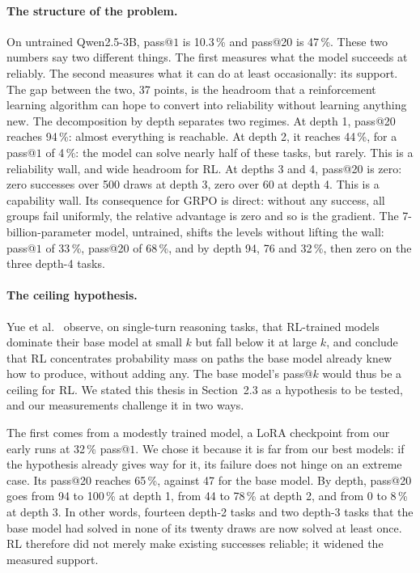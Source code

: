 \documentclass[11pt,a4paper]{article}
\begin{document}
\paragraph{The structure of the problem.} On untrained Qwen2.5-3B, pass@$1$ is 10.3\,\% and pass@20 is 47\,\%. These two numbers say two different things. The first measures what the model succeeds at reliably. The second measures what it can do at least occasionally: its support. The gap between the two, 37 points, is the headroom that a reinforcement learning algorithm can hope to convert into reliability without learning anything new. The decomposition by depth separates two regimes. At depth 1, pass@20 reaches 94\,\%: almost everything is reachable. At depth 2, it reaches 44\,\%, for a pass@$1$ of 4\,\%: the model can solve nearly half of these tasks, but rarely. This is a reliability wall, and wide headroom for RL. At depths 3 and 4, pass@20 is zero: zero successes over 500 draws at depth 3, zero over 60 at depth 4. This is a capability wall. Its consequence for GRPO is direct: without any success, all groups fail uniformly, the relative advantage is zero and so is the gradient. The 7-billion-parameter model, untrained, shifts the levels without lifting the wall: pass@$1$ of 33\,\%, pass@20 of 68\,\%, and by depth 94, 76 and 32\,\%, then zero on the three depth-4 tasks.

\paragraph{The ceiling hypothesis.} Yue et al.~\cite{yue2025rlvr} observe, on single-turn reasoning tasks, that RL-trained models dominate their base model at small $k$ but fall below it at large $k$, and conclude that RL concentrates probability mass on paths the base model already knew how to produce, without adding any. The base model's pass@$k$ would thus be a ceiling for RL. We stated this thesis in Section~2.3 as a hypothesis to be tested, and our measurements challenge it in two ways.

The first comes from a modestly trained model, a LoRA checkpoint from our early runs at 32\,\% pass@$1$. We chose it because it is far from our best models: if the hypothesis already gives way for it, its failure does not hinge on an extreme case. Its pass@20 reaches 65\,\%, against 47 for the base model. By depth, pass@20 goes from 94 to 100\,\% at depth 1, from 44 to 78\,\% at depth 2, and from 0 to 8\,\% at depth 3. In other words, fourteen depth-2 tasks and two depth-3 tasks that the base model had solved in none of its twenty draws are now solved at least once. RL therefore did not merely make existing successes reliable; it widened the measured support.
\end{document}
